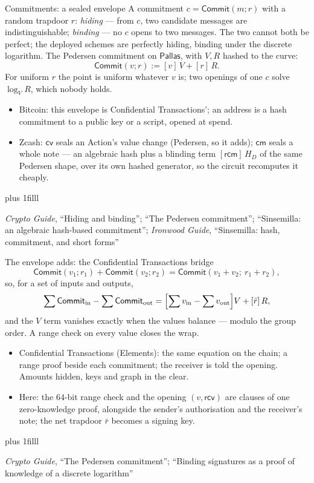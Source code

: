 \documentclass[aspectratio=169,11pt]{beamer}
\newcommand{\Pallas}{\ensuremath{\mathsf{Pallas}}}
\newcommand{\cmsym}{\ensuremath{\mathsf{cm}}}
\newcommand{\cvsym}{\ensuremath{\mathsf{cv}}}
\newcommand{\rcm}{\ensuremath{\mathsf{rcm}}}
\newcommand{\rcv}{\ensuremath{\mathsf{rcv}}}
\newcommand{\Comm}{\ensuremath{\mathsf{Commit}}}
\newcommand{\src}[1]{\par\vskip0pt plus 1filll
  {\fontsize{6}{7.2}\selectfont\color{arbdim}\raggedright #1\par}}
\begin{document}
\begin{frame}{Commitments: a sealed envelope}
A commitment $c = \Comm(m; r)$ with a random trapdoor $r$: \emph{hiding}
--- from $c$, two candidate messages are indistinguishable; \emph{binding}
--- no $c$ opens to two messages. The two cannot both be perfect; the
deployed schemes are perfectly hiding, binding under the discrete logarithm.
\smallskip
The Pedersen commitment on \Pallas{}, with $V, R$ hashed to the curve:
\[
  \Comm(v; r) := [v]\,V + [r]\,R .
\]
For uniform $r$ the point is uniform whatever $v$ is; two openings of one
$c$ solve $\log_{V} R$, which nobody holds.
\begin{itemize}
  \item Bitcoin: this envelope is Confidential Transactions'; an address is
    a hash commitment to a public key or a script, opened at spend.
  \item Zcash: $\cvsym$ seals an Action's value change (Pedersen, so it
    adds); $\cmsym$ seals a whole note --- an algebraic hash plus a
    blinding term $[\rcm]\,H_{D}$ of the same Pedersen shape, over its own
    hashed generator, so the circuit recomputes it cheaply.
\end{itemize}
\src{\emph{Crypto Guide}, ``Hiding and binding''; ``The Pedersen
  commitment''; ``Sinsemilla: an algebraic hash-based commitment'';
  \emph{Ironwood Guide}, ``Sinsemilla: hash, commitment, and short forms''}
\end{frame}

\begin{frame}{The envelope adds: the Confidential Transactions bridge}
\[
  \Comm(v_{1}; r_{1}) + \Comm(v_{2}; r_{2})
  = \Comm(v_{1} + v_{2};\ r_{1} + r_{2}),
\]
so, for a set of inputs and outputs,
\[
  \sum \Comm_{\mathrm{in}} - \sum \Comm_{\mathrm{out}}
  = \Bigl[\sum v_{\mathrm{in}} - \sum v_{\mathrm{out}}\Bigr] V
    + [\bar r]\,R ,
\]
and the $V$ term vanishes exactly when the values balance --- modulo the
group order. A range check on every value closes the wrap.
\begin{itemize}
  \item Confidential Transactions (Elements): the same equation on the
    chain; a range proof beside each commitment; the receiver is told the
    opening. Amounts hidden, keys and graph in the clear.
  \item Here: the $64$-bit range check and the opening $(v, \rcv)$ are
    clauses of one zero-knowledge proof, alongside the sender's
    authorisation and the receiver's note; the net trapdoor $\bar r$
    becomes a signing key.
\end{itemize}
\src{\emph{Crypto Guide}, ``The Pedersen commitment''; ``Binding signatures
  as a proof of knowledge of a discrete logarithm''}
\end{frame}
\end{document}
